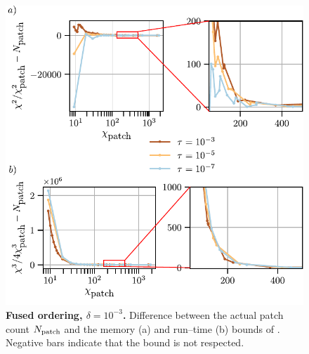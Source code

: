 \begin{figure}
    \centering
    \includegraphics{figures/2DGreenMemoryTimeBoundFused.pdf}
    \caption{\textbf{Fused ordering, \(\delta=10^{-3}\).}
    Difference between the actual patch count \(N_{\text{patch}}\) and the memory (a) and run–time (b) bounds of .
    Negative bars indicate that the bound is not respected.}
    \label{fig:memoryBound2GreenFused}
\end{figure}


